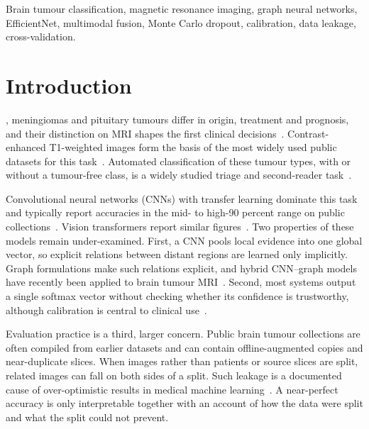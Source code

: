 \documentclass[journal,onecolumn]{IEEEtran}
\begin{document}
\begin{IEEEkeywords}
Brain tumour classification, magnetic resonance imaging, graph neural networks, EfficientNet, multimodal fusion, Monte Carlo dropout, calibration, data leakage, cross-validation.
\end{IEEEkeywords}

\section{Introduction}
, meningiomas and pituitary tumours differ in origin, treatment and prognosis, and their distinction on MRI shapes the first clinical decisions~\cite{louis2021who}. Contrast-enhanced T1-weighted images form the basis of the most widely used public datasets for this task~\cite{cheng2015enhanced}. Automated classification of these tumour types, with or without a tumour-free class, is a widely studied triage and second-reader task~\cite{cheng2015enhanced,deepak2019brain,swati2019brain,badza2020classification,tummala2022classification}.

Convolutional neural networks (CNNs) with transfer learning dominate this task and typically report accuracies in the mid- to high-90 percent range on public collections~\cite{deepak2019brain,swati2019brain,badza2020classification}. Vision transformers report similar figures~\cite{tummala2022classification}. Two properties of these models remain under-examined. First, a CNN pools local evidence into one global vector, so explicit relations between distant regions are learned only implicitly. Graph formulations make such relations explicit, and hybrid CNN--graph models have recently been applied to brain tumour MRI~\cite{gursoy2024braingcn}. Second, most systems output a single softmax vector without checking whether its confidence is trustworthy, although calibration is central to clinical use~\cite{guo2017calibration,gal2016dropout}.

Evaluation practice is a third, larger concern. Public brain tumour collections are often compiled from earlier datasets and can contain offline-augmented copies and near-duplicate slices. When images rather than patients or source slices are split, related images can fall on both sides of a split. Such leakage is a documented cause of over-optimistic results in medical machine learning~\cite{roberts2021pitfalls,varoquaux2022failures,kapoor2023leakage,wen2020alzheimer}. A near-perfect accuracy is only interpretable together with an account of how the data were split and what the split could not prevent.
\end{document}
